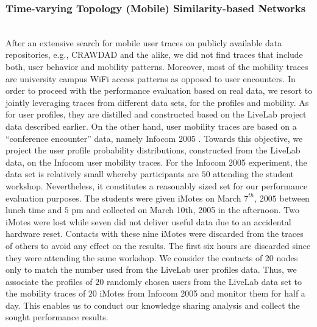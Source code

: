 \documentclass[conference]{IEEEtran}
\theoremstyle{definition}
\begin{document}
\subsubsection{Time-varying Topology (Mobile) Similarity-based Networks}
\vspace{-0.2 cm}
%
\\
%
After an extensive search for mobile user traces on publicly available data repositories, e.g., CRAWDAD \cite{infocom,diot} and the alike, we did not find traces that include both, user behavior and mobility patterns. Moreover, most of the mobility traces are university campus WiFi access patterns as opposed to user encounters. In order to proceed with the performance evaluation based on real data, we resort to jointly leveraging traces from 
different data sets, for the profiles and mobility. As for user profiles, they are distilled 
and constructed based on the LiveLab project data \cite{data} described earlier. On the other hand, user mobility traces are based on a ``conference encounter'' data, namely Infocom 2005 \cite{infocom,diot}. Towards this objective, we project the user profile probability distributions, constructed from the LiveLab data, on the Infocom user mobility traces. For the Infocom 2005 experiment, the data set is relatively small whereby participants are $50$ attending the student workshop. Nevertheless, it constitutes a reasonably sized set for our performance evaluation purposes. The students were given iMotes on March $7^{th}$, $2005$ between lunch time and $5$ pm and collected on March 10th, 2005 in the afternoon. Two iMotes were lost while seven did not deliver useful data due to an accidental hardware reset. Contacts with these nine iMotes were discarded from the traces of others to avoid any effect on the results. 
The first six hours are discarded since they were attending the same workshop. We consider the contacts of $20$ nodes only to match the number used from the LiveLab user profiles data. Thus, we associate the profiles of $20$ randomly chosen users from the LiveLab data set 
to the mobility traces of $20$ iMotes from Infocom 2005 and monitor them for half a day. This enables us to conduct our knowledge sharing analysis and collect the sought performance results.
\end{document}

